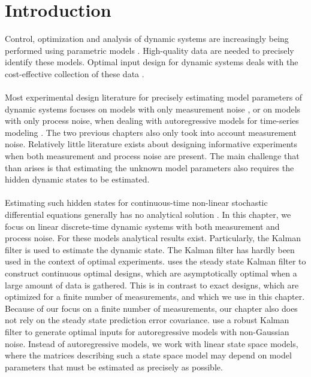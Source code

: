 \section{Introduction}
Control, optimization and analysis of dynamic systems are increasingly being performed using parametric models \parencite{findeisen}. High-quality data are needed to precisely identify these models. Optimal input design for dynamic systems deals with the cost-effective collection of these data \parencite{goodwin}.
\\
\\
Most experimental design literature for precisely estimating model parameters of dynamic systems focuses on models with only measurement noise \parencite{franceschini}, or on models with only process noise, when dealing with autoregressive models for time-series modeling \parencite{hjalmarsson}. The two previous chapters also only took into account measurement noise. Relatively little literature exists about designing informative experiments when both measurement and process noise are present. The main challenge that than arises is that estimating the unknown model parameters also requires the hidden dynamic states to be estimated.
\\
\\
Estimating such hidden states for continuous-time non-linear stochastic differential equations generally has no analytical solution \parencite{solin}. In this chapter, we focus on linear discrete-time dynamic systems with both measurement and process noise. For these models analytical results exist. Particularly, the Kalman filter is used to estimate the dynamic state. The Kalman filter has hardly been used in the context of optimal experiments. \textcite{titterington} uses the steady state Kalman filter to construct continuous optimal designs, which are asymptotically optimal when a large amount of data is gathered. This is in contrast to exact designs, which are optimized for a finite number of measurements, and which we use in this chapter. Because of our focus on a finite number of measurements, our chapter also does not rely on the steady state prediction error covariance. \textcite{stojanovic} use a robust Kalman filter to generate optimal inputs for autoregressive models with non-Gaussian noise. Instead of autoregressive models, we work with linear state space models, where the matrices describing such a state space model may depend on model parameters that must be estimated as precisely as possible.
\\
\\

